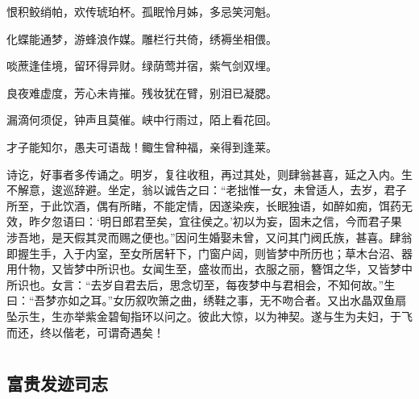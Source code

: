 \documentclass[a4paper,12pt,UTF8,twoside]{ctexbook}
\begin{document}
恨积鲛绡帕，欢传琥珀杯。孤眠怜月姊，多忌笑河魁。

化蝶能通梦，游蜂浪作媒。雕栏行共倚，绣褥坐相偎。

啖蔗逢佳境，留环得异财。绿荫莺并宿，紫气剑双埋。

良夜难虚度，芳心未肯摧。残妆犹在臂，别泪已凝腮。

漏滴何须促，钟声且莫催。峡中行雨过，陌上看花回。

才子能知尔，愚夫可语哉！鲰生曾种福，亲得到逢莱。

诗讫，好事者多传诵之。明岁，复往收租，再过其处，则肆翁甚喜，延之入内。生不解意，逡巡辞避。坐定，翁以诚告之曰：“老拙惟一女，未曾适人，去岁，君子所至，于此饮酒，偶有所睹，不能定情，因遂染疾，长眠独语，如醉如痴，饵药无效，昨夕忽语曰：‘明日郎君至矣，宜往侯之。’初以为妄，固未之信，今而君子果涉吾地，是天假其灵而赐之便也。”因问生婚娶未曾，又问其门阀氏族，甚喜。肆翁即握生手，入于内室，至女所居轩下，门窗户闼，则皆梦中所历也；草木台沼、器用什物，又皆梦中所识也。女闻生至，盛妆而出，衣服之丽，簪饵之华，又皆梦中所识也。女言：“去岁自君去后，思念切至，每夜梦中与君相会，不知何故。”生曰：“吾梦亦如之耳。”女历叙吹箫之曲，绣鞋之事，无不吻合者。又出水晶双鱼扇坠示生，生亦举紫金碧甸指环以问之。彼此大惊，以为神契。遂与生为夫妇，于飞而还，终以偕老，可谓奇遇矣！

\part{}

\chapter{富贵发迹司志}
\end{document}
